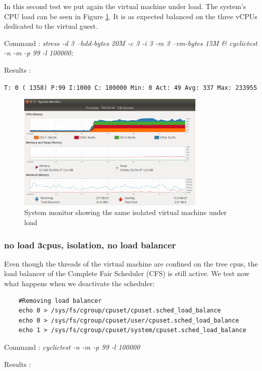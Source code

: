 \documentclass[]{scrartcl}
\begin{document}
In this second test we put again the virtual machine under load. The system's CPU load can be seen in Figure \ref{fig:test-cpuload}. It is as expected balanced on the three vCPUs dedicated to the virtual guest.

\noindent Command : \textit{stress -d 3 --hdd-bytes 20M -c 3 -i 3 -m 3 --vm-bytes 15M \& cyclictest -n -m -p 99 -l 100000;}

\noindent Results : 

\noindent \texttt{T: 0 ( 1358) P:99 I:1000 C: 100000 Min:      0 Act:   49 Avg:  337 Max:   233955}


\begin{figure}[t]
	\centering
	\includegraphics[width=0.8\textwidth]{test-cpuload}
	\caption{System monitor showing the same isolated virtual machine under load}
	\label{fig:test-cpuload}
\end{figure}

\subsubsection{no load 3cpus, isolation, no load balancer}

Even though the threads of the virtual machine are confined on the tree cpus, the load balancer of the Complete Fair Scheduler (CFS) is still active. We test now what happens when we deactivate the scheduler:

\begin{verbatim}
	#Removing load balancer
	echo 0 > /sys/fs/cgroup/cpuset/cpuset.sched_load_balance
	echo 0 > /sys/fs/cgroup/cpuset/user/cpuset.sched_load_balance
	echo 1 > /sys/fs/cgroup/cpuset/system/cpuset.sched_load_balance
\end{verbatim}

\noindent Command : \textit{cyclictest -n -m -p 99 -l 100000}

\noindent Results :
\end{document}
